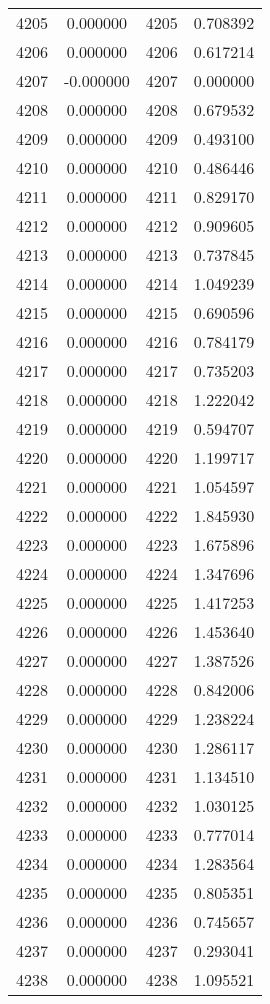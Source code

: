 \documentclass[12pt]{article}
\begin{document}
\begin{longtable}{@{}cccc@{}}
4205 & 0.000000 & 4205 & 0.708392 \\
4206 & 0.000000 & 4206 & 0.617214 \\
4207 & -0.000000 & 4207 & 0.000000 \\
4208 & 0.000000 & 4208 & 0.679532 \\
4209 & 0.000000 & 4209 & 0.493100 \\
4210 & 0.000000 & 4210 & 0.486446 \\
4211 & 0.000000 & 4211 & 0.829170 \\
4212 & 0.000000 & 4212 & 0.909605 \\
4213 & 0.000000 & 4213 & 0.737845 \\
4214 & 0.000000 & 4214 & 1.049239 \\
4215 & 0.000000 & 4215 & 0.690596 \\
4216 & 0.000000 & 4216 & 0.784179 \\
4217 & 0.000000 & 4217 & 0.735203 \\
4218 & 0.000000 & 4218 & 1.222042 \\
4219 & 0.000000 & 4219 & 0.594707 \\
4220 & 0.000000 & 4220 & 1.199717 \\
4221 & 0.000000 & 4221 & 1.054597 \\
4222 & 0.000000 & 4222 & 1.845930 \\
4223 & 0.000000 & 4223 & 1.675896 \\
4224 & 0.000000 & 4224 & 1.347696 \\
4225 & 0.000000 & 4225 & 1.417253 \\
4226 & 0.000000 & 4226 & 1.453640 \\
4227 & 0.000000 & 4227 & 1.387526 \\
4228 & 0.000000 & 4228 & 0.842006 \\
4229 & 0.000000 & 4229 & 1.238224 \\
4230 & 0.000000 & 4230 & 1.286117 \\
4231 & 0.000000 & 4231 & 1.134510 \\
4232 & 0.000000 & 4232 & 1.030125 \\
4233 & 0.000000 & 4233 & 0.777014 \\
4234 & 0.000000 & 4234 & 1.283564 \\
4235 & 0.000000 & 4235 & 0.805351 \\
4236 & 0.000000 & 4236 & 0.745657 \\
4237 & 0.000000 & 4237 & 0.293041 \\
4238 & 0.000000 & 4238 & 1.095521 \\

\end{longtable}
\end{document}
